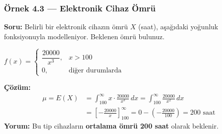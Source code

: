 ﻿\documentclass[light]{lutbeamer}
\begin{document}
\begin{frame}[fragile]
  \frametitle[Örnek 4.3]{Örnek 4.3 --- Elektronik Cihaz Ömrü}

  \smallskip
  \textbf{Soru:} Belirli bir elektronik cihazın ömrü $X$ (saat), aşağıdaki yoğunluk fonksiyonuyla modelleniyor. Beklenen ömrü bulunuz.
  \begin{center}
    $f(x) = \begin{cases} \dfrac{20000}{x^3}, & x > 100 \\[4pt] 0, & \text{diğer durumlarda} \end{cases}$
  \end{center}

  \textbf{Çözüm:}
  {\small
  \begin{align*}
    \mu = E(X) &= \int_{100}^{\infty} x \cdot \frac{20000}{x^3} \,dx = \int_{100}^{\infty} \frac{20000}{x^2} \,dx \\[4pt]
               &= \left[ -\frac{20000}{x} \right]_{100}^{\infty} = 0 - \!\left(-\frac{20000}{100}\right) = 200 \text{ saat}
  \end{align*}
  }
  \textbf{Yorum:} Bu tip cihazların \textbf{ortalama ömrü 200 saat} olarak beklenir.
\end{frame}
\end{document}
